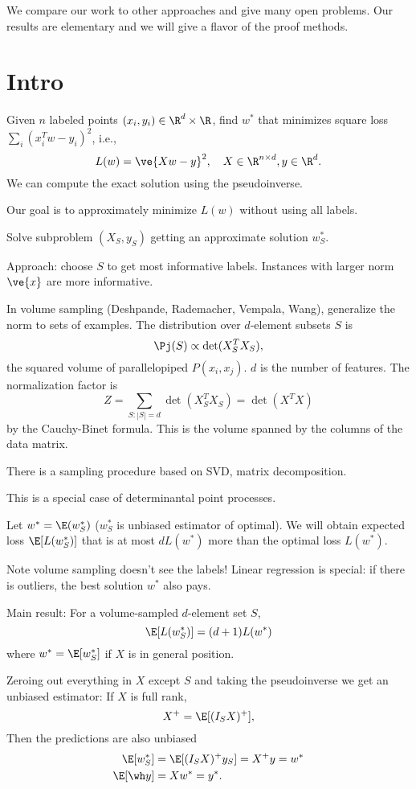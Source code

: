 We compare our work to other approaches and give many open problems.
Our results are elementary and we will give a flavor of the proof methods.

\section{Intro}

Given $n$ labeled points $(x_i,y_i)\in \R^d\times \R$, find $w^*$ that minimizes square loss $\sum_i (x_i^T w-y_i)^2$, i.e.,
$$
L(w) = \ve{Xw-y}^2, \quad X\in \R^{n\times d},y\in \R^d.
$$ 
We can compute the exact solution using the pseudoinverse.

Our goal is to approximately minimize $L(w)$ without using all labels.

Solve subproblem $(X_S,y_S)$ getting an approximate solution $w_S^*$. 

Approach: choose $S$ to get most informative labels.
Instances with larger norm $\ve{x}$ are more informative.

In volume sampling (Deshpande, Rademacher, Vempala, Wang), generalize the norm to sets of examples. The distribution over $d$-element subsets $S$ is 
$$
\Pj(S) \propto \det(X_S^T X_S),
$$
the squared volume of parallelopiped $P(x_i,x_j)$. 
$d$ is the number of features.
The normalization factor is 
$$Z=\sum_{S:|S|=d} \det(X_S^TX_S) = \det (X^TX)$$ by the Cauchy-Binet formula. This is the volume spanned by the columns of the data matrix.

There is a sampling procedure based on SVD, matrix decomposition.

This is a special case of determinantal point processes.

Let $w^*=\E(w_S^*)$ ($w_S^*$ is unbiased estimator of optimal). We will obtain expected loss $\E[L(w_S^*)]$ that is at most $dL(w^*)$ more than the optimal loss $L(w^*)$. 

Note volume sampling doesn't see the labels! Linear regression is special: if there is outliers, the best solution $w^*$ also pays. %


Main result: 
For a volume-sampled $d$-element set $S$,
$$
\E [L(w_S^*)] = (d+1) L(w^*)
$$
where $w^*=\E[w_S^*]$ if $X$ is in general position.

Zeroing out everything in $X$ except $S$ and taking the pseudoinverse we get an unbiased estimator: If $X$ is full rank,
$$
X^+ = \E[(I_SX)^+],
$$
Then the predictions are also unbiased
\begin{align}
\E[w_S^*] &= \E[(I_SX)^+ y_S] = X^+y = w^*\\
\E[\wh y] &= Xw^* = y^*.
\end{align}

